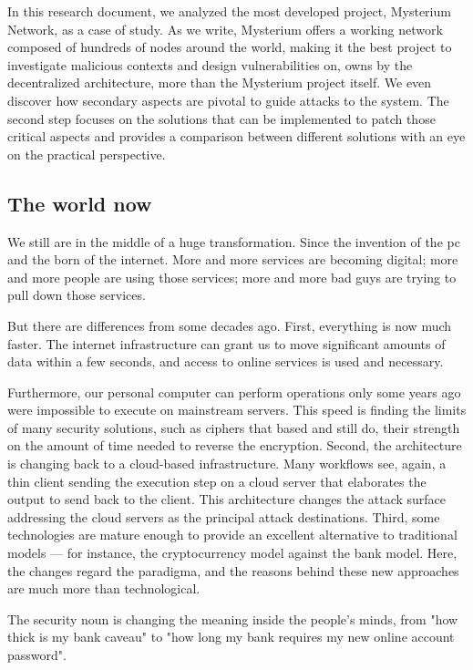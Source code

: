 \documentclass[]{article}
\begin{document}
    In this research document, we analyzed the most developed project, Mysterium Network, as a case of study. As we write, Mysterium offers a working network composed of hundreds of nodes around the world, making it the best project to investigate malicious contexts and design vulnerabilities on, owns by the decentralized architecture, more than the Mysterium project itself.
	We even discover how secondary aspects are pivotal to guide attacks to the system.
    The second step focuses on the solutions that can be implemented to patch those critical aspects and provides a comparison between different solutions with an eye on the practical perspective.
	
	\subsection{The world now}
	We still are in the middle of a huge transformation. Since the invention of the pc and the born of the internet. More and more services are becoming digital; more and more people are using those services; more and more bad guys are trying to pull down those services.

	But there are differences from some decades ago.
	First, everything is now much faster. The internet infrastructure can grant us to move significant amounts of data within a few seconds, and access to online services is used and necessary. 

	Furthermore, our personal computer can perform operations only some years ago were impossible to execute on mainstream servers. This speed is finding the limits of many security solutions, such as ciphers that based and still do, their strength on the amount of time needed to reverse the encryption.
	Second, the architecture is changing back to a cloud-based infrastructure. Many workflows see, again, a thin client sending the execution step on a cloud server that elaborates the output to send back to the client. This architecture changes the attack surface addressing the cloud servers as the principal attack destinations.
	Third, some technologies are mature enough to provide an excellent alternative to traditional models — for instance, the cryptocurrency model against the bank model. Here, the changes regard the paradigma, and the reasons behind these new approaches are much more than technological.

	The security noun is changing the meaning inside the people's minds, from "how thick is my bank caveau" to "how long my bank requires my new online account password".
\end{document}

